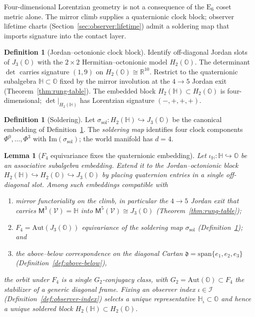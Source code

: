 \documentclass[11pt]{article}
\theoremstyle{plain}
\newtheorem{lemma}[theorem]{Lemma}
\theoremstyle{definition}
\newtheorem{definition}[theorem]{Definition}
\theoremstyle{remark}
\numberwithin{equation}{section}
\newcommand{\R}{\mathbb{R}}
\newcommand{\Quat}{\mathbb{H}}
\newcommand{\Oct}{\mathbb{O}}
\newcommand{\jalg}{J_3(\mathbb{O})}
\newcommand{\E}[1]{\mathrm{E}_{#1}}
\newcommand{\Void}{\mathcal{V}}
\newcommand{\Mirror}{\mathsf{M}}
\newcommand{\orderparam}{\Phi}
\begin{document}
Four-dimensional Lorentzian geometry is not a consequence of the $\E{6}$
coset metric alone. The mirror climb supplies a quaternionic clock block;
observer lifetime charts (Section~\ref{sec:observer:lifetime}) admit a
soldering map that imports signature into the contact layer.

\begin{definition}[Jordan--octonionic clock block]\label{def:spacetime:H2O}
Identify off-diagonal Jordan slots of $\jalg$ with the $2\times2$
Hermitian--octonionic model $H_2(\Oct)$. The determinant $\det$ carries
signature $(1,9)$ on $H_2(\Oct)\cong\R^{10}$. Restrict to the quaternionic
subalgebra $\Quat\subset\Oct$ fixed by the mirror involution at the
$4\to5$ Jordan exit (Theorem~\ref{thm:rung-table}). The embedded block
$H_2(\Quat)\subset H_2(\Oct)$ is four-dimensional; $\det|_{H_2(\Quat)}$
has Lorentzian signature $(-,+,+,+)$.
\end{definition}

\begin{definition}[Soldering]\label{def:soldering}
Let $\sigma_{\mathrm{sol}}:H_2(\Quat)\hookrightarrow\jalg$ be the canonical
embedding of Definition~\ref{def:spacetime:H2O}. The \emph{soldering map}
identifies four clock components $\orderparam^0,\ldots,\orderparam^3$ with
$\mathrm{Im}(\sigma_{\mathrm{sol}})$; the world manifold has $d=4$.
\end{definition}

\begin{lemma}[$F_4$ equivariance fixes the quaternionic embedding]
\label{lem:quat-F4}
Let $\iota_{\Quat}:\Quat\hookrightarrow\Oct$ be an associative subalgebra
embedding. Extend it to the Jordan--octonionic block
$H_2(\Quat)\hookrightarrow H_2(\Oct)\hookrightarrow\jalg$ by placing
quaternion entries in a single off-diagonal slot. Among such embeddings
compatible with
\begin{enumerate}[label=(\roman*),leftmargin=*]
  \item mirror functoriality on the climb, in particular the
    $4\to5$ Jordan exit that carries $\Mirror^3(\Void)=\Quat$ into
    $\Mirror^5(\Void)\cong\jalg$ (Theorem~\ref{thm:rung-table});
  \item $F_4=\mathrm{Aut}(\jalg)$ equivariance of the soldering map
    $\sigma_{\mathrm{sol}}$ (Definition~\ref{def:soldering}); and
  \item the above--below correspondence on the diagonal Cartan
    $\mathfrak{d}=\mathrm{span}\{e_1,e_2,e_3\}$
    (Definition~\ref{def:above-below}),
\end{enumerate}
the orbit under $F_4$ is a single $G_2$-conjugacy class, with
$G_2=\mathrm{Aut}(\Oct)\subset F_4$ the stabilizer of a generic
diagonal frame. Fixing an observer index $\iota\in\mathcal{I}$
(Definition~\ref{def:observer-index}) selects a unique representative
$\Quat_\iota\subset\Oct$ and hence a unique soldered block
$H_2(\Quat)\subset H_2(\Oct)$.
\end{lemma}
\end{document}
